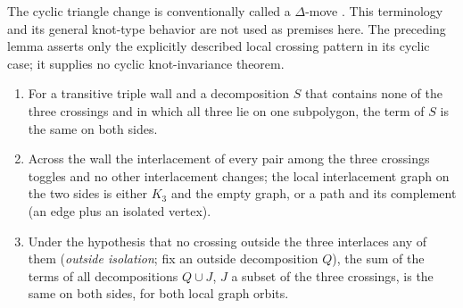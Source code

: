 \begin{remark}
The cyclic triangle change is conventionally called a $\Delta$-move
\cite{MurakamiNakanishi}. This terminology and its general knot-type
behavior are not used as premises here. The preceding lemma asserts
only the explicitly described local crossing pattern in its cyclic case;
it supplies no cyclic knot-invariance theorem.
\end{remark}

\begin{proposition}\label{prop:R-partial}
\begin{enumerate}
\item[(i)] For a transitive triple wall and a decomposition $S$ that contains
none of the three crossings and in which all three lie on one subpolygon,
the term of $S$ is the same on both sides.
\item[(ii)] Across the wall the interlacement of every pair among the three
crossings toggles and no other interlacement changes; the local
interlacement graph on the two sides is either $K_3$ and the empty graph, or
a path and its complement (an edge plus an isolated vertex).
\item[(iii)] Under the hypothesis that no crossing outside the three
interlaces any of them (\emph{outside isolation}; fix an outside decomposition
$Q$), the sum of the terms of all decompositions $Q\cup J$, $J$ a subset of
the three crossings, is the same on both sides, for both local graph orbits.
\end{enumerate}
\end{proposition}
